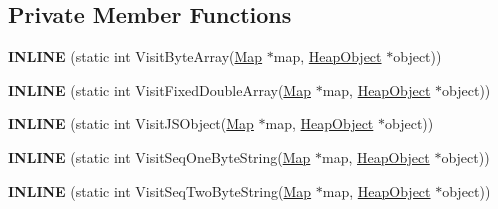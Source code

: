 \subsection*{Private Member Functions}
\begin{DoxyCompactItemize}
\item 
{\bfseries I\+N\+L\+I\+NE} (static int Visit\+Byte\+Array(\hyperlink{classv8_1_1internal_1_1_map}{Map} $\ast$map, \hyperlink{classv8_1_1internal_1_1_heap_object}{Heap\+Object} $\ast$object))\hypertarget{classv8_1_1internal_1_1_static_new_space_visitor_aab3f9bdfadbb3eb07b6f2510cf264813}{}\label{classv8_1_1internal_1_1_static_new_space_visitor_aab3f9bdfadbb3eb07b6f2510cf264813}

\item 
{\bfseries I\+N\+L\+I\+NE} (static int Visit\+Fixed\+Double\+Array(\hyperlink{classv8_1_1internal_1_1_map}{Map} $\ast$map, \hyperlink{classv8_1_1internal_1_1_heap_object}{Heap\+Object} $\ast$object))\hypertarget{classv8_1_1internal_1_1_static_new_space_visitor_a0c185adced0b1ae5aeccc63f1100d3b2}{}\label{classv8_1_1internal_1_1_static_new_space_visitor_a0c185adced0b1ae5aeccc63f1100d3b2}

\item 
{\bfseries I\+N\+L\+I\+NE} (static int Visit\+J\+S\+Object(\hyperlink{classv8_1_1internal_1_1_map}{Map} $\ast$map, \hyperlink{classv8_1_1internal_1_1_heap_object}{Heap\+Object} $\ast$object))\hypertarget{classv8_1_1internal_1_1_static_new_space_visitor_a8351f38e4a5f8b4f9be5636b2f563b8b}{}\label{classv8_1_1internal_1_1_static_new_space_visitor_a8351f38e4a5f8b4f9be5636b2f563b8b}

\item 
{\bfseries I\+N\+L\+I\+NE} (static int Visit\+Seq\+One\+Byte\+String(\hyperlink{classv8_1_1internal_1_1_map}{Map} $\ast$map, \hyperlink{classv8_1_1internal_1_1_heap_object}{Heap\+Object} $\ast$object))\hypertarget{classv8_1_1internal_1_1_static_new_space_visitor_a186169bd556c55aec81c03d95aeddcd6}{}\label{classv8_1_1internal_1_1_static_new_space_visitor_a186169bd556c55aec81c03d95aeddcd6}

\item 
{\bfseries I\+N\+L\+I\+NE} (static int Visit\+Seq\+Two\+Byte\+String(\hyperlink{classv8_1_1internal_1_1_map}{Map} $\ast$map, \hyperlink{classv8_1_1internal_1_1_heap_object}{Heap\+Object} $\ast$object))\hypertarget{classv8_1_1internal_1_1_static_new_space_visitor_aea90bdffdca9f71c804a00bff7f12db2}{}\label{classv8_1_1internal_1_1_static_new_space_visitor_aea90bdffdca9f71c804a00bff7f12db2}


\end{DoxyCompactItemize}
